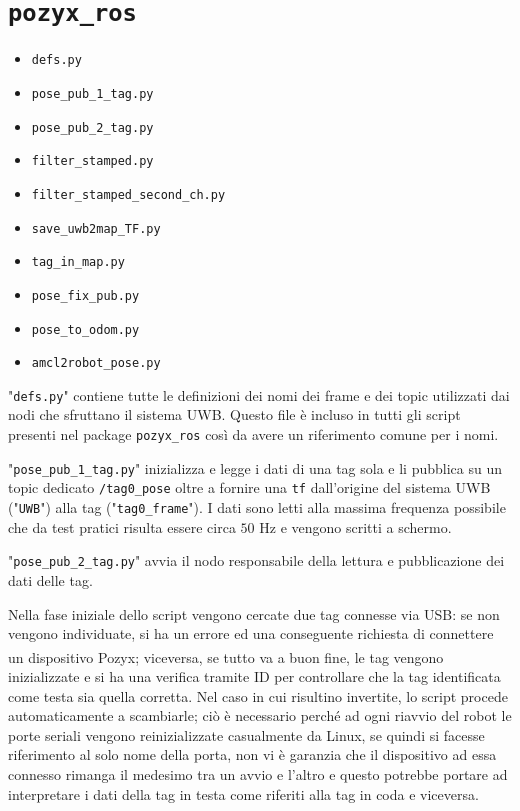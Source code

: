 \section*{\texttt{pozyx\_ros}}

\begin{itemize}
    \item \verb!defs.py!
    \item \verb!pose_pub_1_tag.py!
    \item \verb!pose_pub_2_tag.py!
    \item \verb!filter_stamped.py!
    \item \verb!filter_stamped_second_ch.py!
    \item \verb!save_uwb2map_TF.py!
    \item \verb!tag_in_map.py!
    \item \verb!pose_fix_pub.py!
    \item \verb!pose_to_odom.py!
    \item \verb!amcl2robot_pose.py!
\end{itemize}

"\verb!defs.py!" contiene tutte le definizioni dei nomi dei frame e dei topic utilizzati dai nodi che sfruttano il sistema UWB. Questo file è incluso in tutti gli script presenti nel package \verb!pozyx_ros! così da avere un riferimento comune per i nomi.

\bigskip

"\verb!pose_pub_1_tag.py!" inizializza e legge i dati di una tag sola e li pubblica su un topic dedicato \verb!/tag0_pose! oltre a fornire una \verb!tf! dall'origine del sistema UWB ("\verb!UWB!") alla tag ("\verb!tag0_frame!"). I dati sono letti alla massima frequenza possibile che da test pratici risulta essere circa $50$ Hz e vengono scritti a schermo. 

\bigskip

"\verb!pose_pub_2_tag.py!" avvia il nodo responsabile della lettura e pubblicazione dei dati delle tag.

Nella fase iniziale dello script vengono cercate due tag connesse via USB: se non vengono individuate, si ha un errore ed una conseguente richiesta di connettere un dispositivo Pozyx\textsuperscript\textregistered; viceversa, se tutto va a buon fine, le tag vengono inizializzate e si ha una verifica tramite ID per controllare che la tag identificata come testa sia quella corretta. Nel caso in cui risultino invertite, lo script procede automaticamente a scambiarle; ciò è necessario perché ad ogni riavvio del robot le porte seriali vengono reinizializzate casualmente da Linux, se quindi si facesse riferimento al solo nome della porta, non vi è garanzia che il dispositivo ad essa connesso rimanga il medesimo tra un avvio e l'altro e questo potrebbe portare ad interpretare i dati della tag in testa come riferiti alla tag in coda e viceversa.

